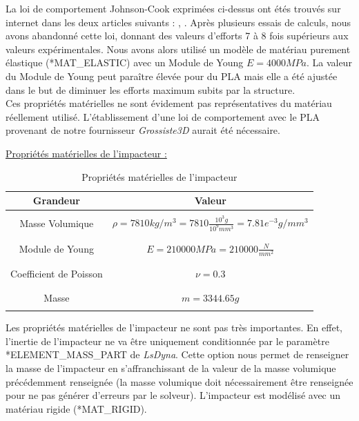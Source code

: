 \documentclass[a4paper]{article}
\begin{document}
	\hspace{0.5cm}La loi de comportement Johnson-Cook exprimées ci-dessus ont étés trouvés sur internet dans les deux articles suivants : \cite{JC_PLA1},  \cite{JC_PLA2}. Après plusieurs essais de calculs, nous avons abandonné cette loi, donnant des valeurs d'efforts 7 à 8 fois supérieurs aux valeurs expérimentales. Nous avons alors utilisé un modèle de matériau purement élastique (*MAT\_ELASTIC) avec un Module de Young $E = 4 000 MPa$. La valeur du Module de Young peut paraître élevée pour du PLA mais elle a été ajustée dans le but de diminuer les efforts maximum subits par la structure.\\
	
	\hspace{0.5cm}Ces propriétés matérielles ne sont évidement pas représentatives du matériau réellement utilisé. L'établissement d'une loi de comportement avec le PLA provenant de notre fournisseur \textit{Grossiste3D} aurait été nécessaire.
	\newpage
	
	\hspace{0.5cm}\underline{Propriétés matérielles de l'impacteur :}
	
	\begin{table}[!h]
		\centering
		\begin{tabular}{|c|c|}
			\hline
			\rowcolor{Gray}
			\textbf{Grandeur} & \textbf{Valeur}\\\hline\hline
			& \\
			Masse Volumique & $\rho = 7810kg/m^{3} = 7810 \frac{10^{3}g}{10^{9}mm^{3}} = 7.81e^{-3} g/mm^{3}$\\
			& \\\hline
			& \\
			Module de Young & $E = 210 000 MPa = 210 000 \frac{N}{mm^{2}}$\\
			& \\\hline
			& \\
			Coefficient de Poisson & $\nu = 0.3$\\
			& \\\hline
			& \\
			Masse & $m = 3344.65 g$\\
			& \\\hline
		\end{tabular}
		\caption{Propriétés matérielles de l'impacteur}
	\end{table}
	
	\hspace{0.5cm}Les propriétés matérielles de l'impacteur ne sont pas très importantes. En effet, l'inertie de l'impacteur ne va être uniquement conditionnée par le paramètre *ELEMENT\_MASS\_PART de \textit{LsDyna}. Cette option nous permet de renseigner la masse de l'impacteur en s'affranchissant de la valeur de la masse volumique précédemment renseignée (la masse volumique doit nécessairement être renseignée pour ne pas générer d'erreurs par le solveur). L'impacteur est modélisé avec un matériau rigide (*MAT\_RIGID).
	
\end{document}
